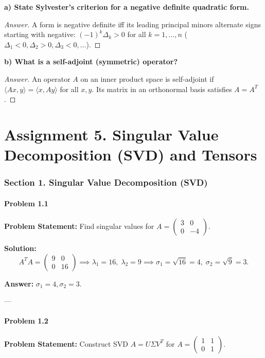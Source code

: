 \documentclass[11pt, a4paper]{article}
\begin{document}
\textbf{a) State Sylvester's criterion for a negative definite quadratic form.}
\begin{proof}[Answer]
A form is negative definite iff its leading principal minors alternate signs starting with negative: $(-1)^k \Delta_k > 0$ for all $k=1, \dots, n$ ($\Delta_1 < 0, \Delta_2 > 0, \Delta_3 < 0, \dots$).
\end{proof}

\textbf{b) What is a self-adjoint (symmetric) operator?}
\begin{proof}[Answer]
An operator $A$ on an inner product space is self-adjoint if $\langle Ax, y \rangle = \langle x, Ay \rangle$ for all $x, y$. Its matrix in an orthonormal basis satisfies $A = A^T$.
\end{proof}

\newpage

\part{Assignment 5. Singular Value Decomposition (SVD) and Tensors}

\section{Section 1. Singular Value Decomposition (SVD)}

\subsection*{Problem 1.1}
\textbf{Problem Statement:} Find singular values for $A = \begin{pmatrix} 3 & 0 \\ 0 & -4 \end{pmatrix}$.

\textbf{Solution:}
$$ A^T A = \begin{pmatrix} 9 & 0 \\ 0 & 16 \end{pmatrix} \implies \lambda_1 = 16, \; \lambda_2 = 9 \implies \sigma_1 = \sqrt{16} = 4, \; \sigma_2 = \sqrt{9} = 3. $$

\textbf{Answer:} $\sigma_1 = 4, \sigma_2 = 3$.

---

\subsection*{Problem 1.2}
\textbf{Problem Statement:} Construct SVD $A = U \Sigma V^T$ for $A = \begin{pmatrix} 1 & 1 \\ 0 & 1 \end{pmatrix}$.
\end{document}
